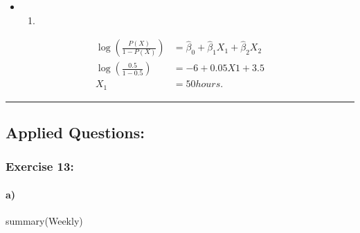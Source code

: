\documentclass[
]{article}
\newenvironment{Shaded}{\begin{snugshade}}{\end{snugshade}}
\newcommand{\FunctionTok}[1]{\textcolor[rgb]{0.00,0.00,0.00}{#1}}
\newcommand{\NormalTok}[1]{#1}
\providecommand{\tightlist}{%
  \setlength{\itemsep}{0pt}\setlength{\parskip}{0pt}}
\begin{document}
\begin{itemize}
\item
  \begin{enumerate}
  \def\labelenumi{\alph{enumi})}
  \setcounter{enumi}{1}
  \tightlist
  \item
  \end{enumerate}
\end{itemize}

\[
\begin{aligned}
\log(\frac{P(X)}{1 - P(X)}) &= \hat\beta_0 + \hat\beta_1X_1 + \hat\beta_2X_2\\
\log(\frac{0.5}{1 - 0.5}) &= -6 + 0.05X1 + 3.5\\
X_1 &= 50 hours. 
\end{aligned}
\]

\begin{center}\rule{0.5\linewidth}{0.5pt}\end{center}

\hypertarget{applied-questions}{%
\subsection{Applied Questions:}\label{applied-questions}}

\hypertarget{exercise-13}{%
\subsubsection{Exercise 13:}\label{exercise-13}}

\hypertarget{a}{%
\paragraph{a)}\label{a}}

\begin{Shaded}
\begin{Highlighting}[]
\FunctionTok{summary}\NormalTok{(Weekly)}
\end{Highlighting}
\end{Shaded}
\end{document}
